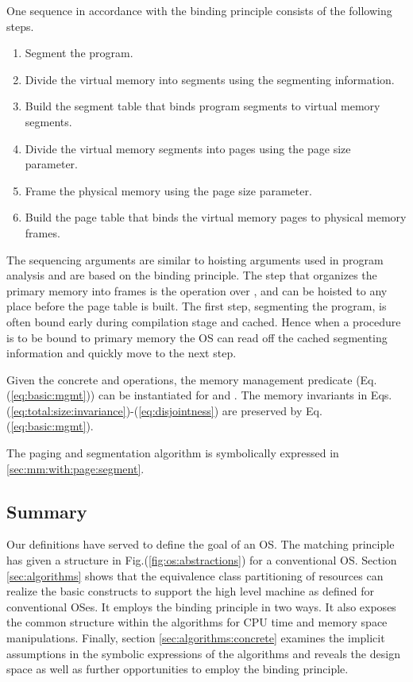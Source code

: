 \documentclass[draft]{article}
\begin{document}
One sequence in accordance with  the binding principle consists of the
following steps.
\label{paging:algo:schematic}
\begin{enumerate}
\item Segment the program.
\item Divide  the virtual  memory   into segments  using the
  segmenting information.
\item Build the  segment table that binds program  segments to virtual
  memory segments.
\item Divide  the virtual  memory segments into  pages using  the page
  size parameter.
\item Frame  the physical memory  using the page size parameter.
\item Build  the page  table that  binds the  virtual memory  pages to
  physical memory frames.
\end{enumerate}
The  sequencing arguments are  similar to  hoisting arguments  used in
program analysis  and are  based on the  binding principle.   The step
that organizes the  primary memory into frames is  the  operation
over ,  and can be  hoisted to any  place before the page  table is
built.  The first  step, segmenting the program, is  often bound early
during compilation stage and cached.   Hence when a procedure is to be
bound  to primary memory  the OS  can read  off the  cached segmenting
information and quickly move to the next step.

Given the concrete   and  operations, the memory management
predicate   (Eq.(\ref{eq:basic:mgmt}))   can   be   instantiated   for
     and     .       The     memory     invariants     in
Eqs.(\ref{eq:total:size:invariance})-(\ref{eq:disjointness})       are
preserved by Eq.(\ref{eq:basic:mgmt}).

The  paging and  segmentation algorithm  is symbolically  expressed in
\ref{sec:mm:with:page:segment}.

\subsection{Summary}
\label{sec:single:cpu:summary}

Our definitions have served to define the goal of an OS.  The matching
principle has given a structure in Fig.(\ref{fig:os:abstractions}) for
a  conventional  OS.   Section  \ref{sec:algorithms}  shows  that  the
equivalence  class partitioning  of  resources can  realize the  basic
constructs  to   support  the  high  level  machine   as  defined  for
conventional OSes.  It employs the  binding principle in two ways.  It
also exposes the  common structure within the algorithms  for CPU time
and     memory      space     manipulations.      Finally,     section
\ref{sec:algorithms:concrete} examines the implicit assumptions in the
symbolic expressions of the algorithms and reveals the design space as
well as further opportunities to employ the binding principle.
\end{document}
